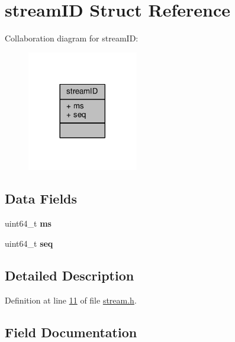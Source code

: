 \hypertarget{structstreamID}{}\section{stream\+ID Struct Reference}
\label{structstreamID}


Collaboration diagram for stream\+ID\+:\nopagebreak
\begin{figure}[H]
\begin{center}
\leavevmode
\includegraphics[width=137pt]{structstreamID__coll__graph}
\end{center}
\end{figure}
\subsection*{Data Fields}
\begin{DoxyCompactItemize}
\item 
\mbox{\label{structstreamID_a3f766f377881ed83e3beeccac33b23be}} 
uint64\+\_\+t {\bfseries ms}
\item 
\mbox{\label{structstreamID_a5348670bb3305c4b9f50b93e212a99a0}} 
uint64\+\_\+t {\bfseries seq}
\end{DoxyCompactItemize}


\subsection{Detailed Description}


Definition at line \hyperlink{stream_8h_source_l00011}{11} of file \hyperlink{stream_8h_source}{stream.\+h}.



\subsection{Field Documentation}
\mbox{\label{structstreamID_a3f766f377881ed83e3beeccac33b23be}} 
